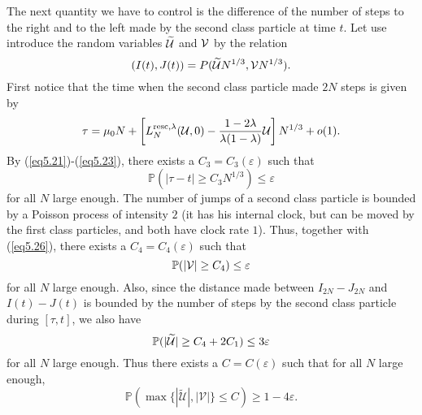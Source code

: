 \documentclass[12pt,a4paper]{article}
\numberwithin{equation}{section}
\newcommand{\Pb}{\mathbb{P}}
\newcommand{\e}{\varepsilon}
\begin{document}
The next quantity we have to control is the difference of the  number of steps to the right and to the left made by the second class particle at time $t$. Let use introduce the random variables $\widetilde {\cal U}$ and $\cal V$ by the relation
\begin{equation}
(I(t),J(t))=P(\widetilde {\cal U} N^{1/3},{\cal V} N^{1/3}).
\end{equation}
First notice that the time when the second class particle made $2N$ steps is given by
\begin{equation}\label{eq5.18}
\tau=\mu_0 N + \left[L_N^{{\rm resc},\lambda}({\cal U},0)-\frac{1-2\lambda}{\lambda(1-\lambda)}{\cal U}\right] N^{1/3}+o(1).
\end{equation}
By (\ref{eq5.21})-(\ref{eq5.23}), there exists a $C_3=C_3(\e)$ such that
\begin{equation}\label{eq5.26}
\Pb\left(\left|\tau- t\right|\geq C_3 N^{1/3}\right)\leq \e
\end{equation}
for all $N$ large enough. The number of jumps of a second class particle is bounded by a Poisson process of intensity $2$ (it has his internal clock, but can be moved by the first class particles, and both have clock rate $1$). Thus, together with (\ref{eq5.26}), there exists a $C_4=C_4(\e)$ such that
\begin{equation}
\Pb(|{\cal V}|\geq C_4)\leq \e
\end{equation}
for all $N$ large enough. Also, since the distance made between $I_{2N}-J_{2N}$ and $I(t)-J(t)$ is bounded by the number of steps by the second class particle during $[\tau,t]$, we also have
\begin{equation}
\Pb(|\widetilde {\cal U}|\geq C_4+2C_1)\leq 3\e
\end{equation}
for all $N$ large enough. Thus there exists a $C=C(\e)$ such that for all $N$ large enough,
\begin{equation}\label{eq:OrderOfShift}
\Pb\left(\max\{|\widetilde{\mathcal{U}}|, |\mathcal{V}|\}\leq C\right)\geq 1-4\e.
\end{equation}
\end{document}
